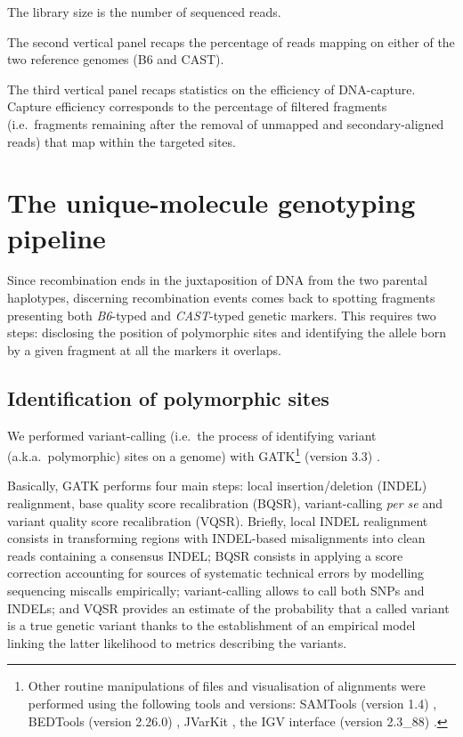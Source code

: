 \begin{sidewaystable}[p]
{		The library size is the number of sequenced reads.
		\par The second vertical panel recaps the percentage of reads mapping on either of the two reference genomes (B6 and CAST).
		\par The third vertical panel recaps statistics on the efficiency of DNA-capture.
		Capture efficiency corresponds to the percentage of filtered fragments (i.e.\ fragments remaining after the removal of unmapped and secondary-aligned reads) that map within the targeted sites.
	}
\label{tab:characteristics-seq-mapping-capture}
\end{sidewaystable}





\section{The unique-molecule genotyping pipeline}
\label{sec:pipeline}

Since recombination ends in the juxtaposition of DNA from the two parental haplotypes, discerning recombination events comes back to spotting fragments presenting both \textit{B6}-typed and \textit{CAST}-typed genetic markers.
This requires two steps: disclosing the position of polymorphic sites and identifying the allele born by a given fragment at all the markers it overlaps.


\subsection{Identification of polymorphic sites}

We performed variant-calling (i.e.\ the process of identifying variant (a.k.a.\ polymorphic) sites on a genome) with GATK\footnote{Other routine manipulations of files and visualisation of alignments were performed using the following tools and versions: SAMTools (version 1.4) \citep{li2009sequence}, BEDTools (version 2.26.0) \citep{quinlan2010bedtools}, JVarKit \citep{lindenbaum2015jvarkit}, the IGV interface (version 2.3\_88) \citep{robinson2011integrative}.} (version 3.3) \citep{mckenna2010genome}.

Basically, GATK performs four main steps: local insertion/deletion (INDEL) realignment, base quality score recalibration (BQSR), variant-calling \textit{per se} and variant quality score recalibration (VQSR).
Briefly, local INDEL realignment consists in transforming regions with INDEL-based misalignments into clean reads containing a consensus INDEL\@; BQSR consists in applying a score correction accounting for sources of systematic technical errors by modelling sequencing miscalls empirically; variant-calling allows to call both SNPs and INDELs; and VQSR provides an estimate of the probability that a called variant is a true genetic variant thanks to the establishment of an empirical model linking the latter likelihood to metrics describing the variants.\\

